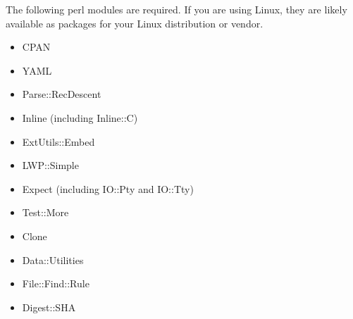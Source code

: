 \documentclass[12pt]{article}
\begin{document}
The following perl modules are required.  If you are using Linux, they
are likely available as packages for your Linux distribution or vendor.

\begin{itemize}
   \item CPAN
   \item YAML
   \item Parse::RecDescent
   \item Inline (including Inline::C)
   \item ExtUtils::Embed
   \item LWP::Simple
   \item Expect (including IO::Pty and IO::Tty)
   \item Test::More
   \item Clone
   \item Data::Utilities
   \item File::Find::Rule
   \item Digest::SHA
\end{itemize}
\end{document}
